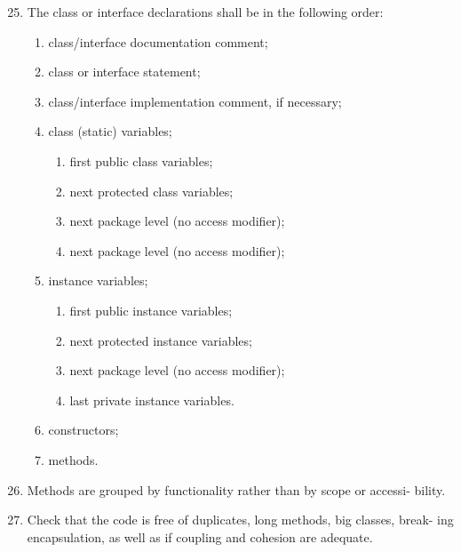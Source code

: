 \begin{enumerate}
\setcounter{enumi}{24}

\item The class or interface declarations shall be in the following order:

	\begin{enumerate}
	
	\item class/interface documentation comment;
	
	\item class or interface statement;

	\item class/interface implementation comment, if necessary;
	
	\item class (static) variables;
	
		\begin{enumerate}
			
			\item  first public class variables;
			
			\item next protected class variables;
			
			\item next package level (no access modifier);
			
			\item next package level (no access modifier);			
			
		\end{enumerate}

	\item instance variables;
	
		\begin{enumerate}
		
			\item first public instance variables;
			
			\item next protected instance variables;
			
			\item next package level (no access modifier);
			
			\item last private instance variables.		
		
		\end{enumerate}

	\item constructors;
	
	\item methods.

	\end{enumerate}
	
\item Methods are grouped by functionality rather than by scope or accessi- bility.

\item Check that the code is free of duplicates, long methods, big classes, break- ing encapsulation, as well as if coupling and cohesion are adequate.

\end{enumerate}

